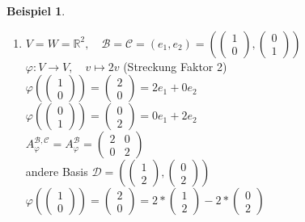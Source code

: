 \documentclass[a4paper,11pt]{article}
\newtheorem{bsp}[definition]{Beispiel}
\begin{document}
\begin{bsp}
\end{bsp}
\begin{enumerate}[label=\alph*)]
	\item $V=W=\mathbb{R}^2,\quad \mathcal{B}=\mathcal{C}=(e_1,e_2)=\left(\begin{pmatrix}1\\0\end{pmatrix},\begin{pmatrix}0\\1\end{pmatrix}\right)$ \\
	$\varphi\colon V\to V,\quad v\mapsto 2v$ (Streckung Faktor 2) \\
	$\varphi\left(\begin{pmatrix}1\\0\end{pmatrix}\right)=\begin{pmatrix}2\\0\end{pmatrix}=2e_1+0e_2$ \\
	$\varphi\left(\begin{pmatrix}0\\1\end{pmatrix}\right)=\begin{pmatrix}0\\2\end{pmatrix}=0e_1+2e_2$ \\
	$A^{\mathcal{B},\mathcal{C}}_\varphi=A^\mathcal{B}_\varphi=\begin{pmatrix}2 & 0 \\ 0 & 2\end{pmatrix}$ \\
	andere Basis $\mathcal{D}=\left(\begin{pmatrix}1\\2\end{pmatrix},\begin{pmatrix}0\\2\end{pmatrix}\right)$ \\
	$\varphi\left(\begin{pmatrix}1\\0\end{pmatrix}\right)=\begin{pmatrix}2\\0\end{pmatrix}=2*\begin{pmatrix}1\\2\end{pmatrix}-2*\begin{pmatrix}0\\2\end{pmatrix}$ \\

\end{enumerate}
\end{document}
